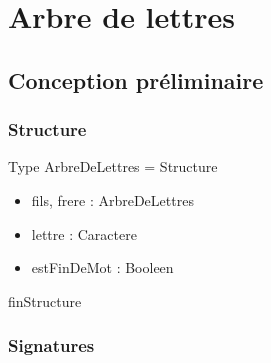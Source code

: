 \section*{Arbre de lettres}
\subsection*{Conception préliminaire}
\subsubsection*{Structure}

Type ArbreDeLettres = Structure
\begin{itemize}[label=$\ $, leftmargin=2cm]
     \item fils, frere : ArbreDeLettres
     \item lettre : Caractere
     \item estFinDeMot : Booleen 
\end{itemize}
finStructure

\subsubsection*{Signatures}

